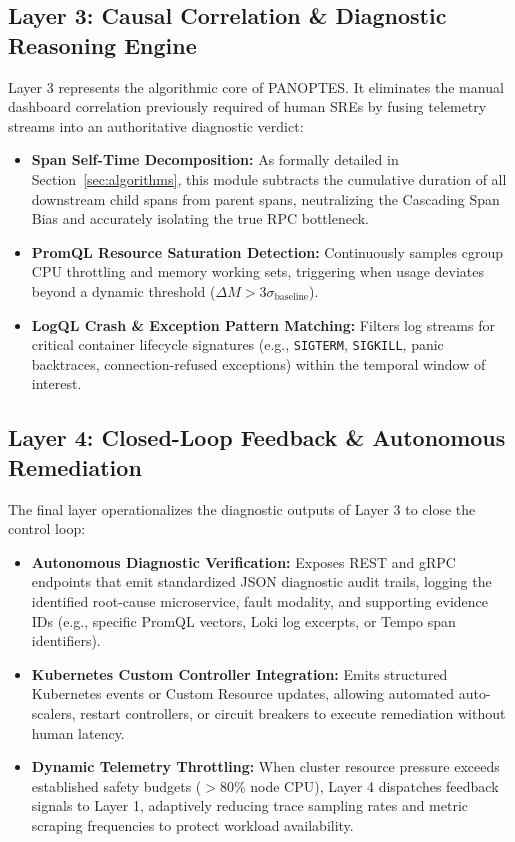 \subsection{Layer 3: Causal Correlation \& Diagnostic Reasoning Engine}
Layer 3 represents the algorithmic core of PANOPTES. It eliminates the manual dashboard correlation previously required of human SREs by fusing telemetry streams into an authoritative diagnostic verdict:
\begin{itemize}[leftmargin=1.2em, itemsep=2pt, topsep=3pt]
    \item \textbf{Span Self-Time Decomposition:} As formally detailed in Section~\ref{sec:algorithms}, this module subtracts the cumulative duration of all downstream child spans from parent spans, neutralizing the Cascading Span Bias and accurately isolating the true RPC bottleneck.
    \item \textbf{PromQL Resource Saturation Detection:} Continuously samples cgroup CPU throttling and memory working sets, triggering when usage deviates beyond a dynamic threshold ($\Delta M > 3\sigma_{\text{baseline}}$).
    \item \textbf{LogQL Crash \& Exception Pattern Matching:} Filters log streams for critical container lifecycle signatures (e.g., \texttt{SIGTERM}, \texttt{SIGKILL}, panic backtraces, connection-refused exceptions) within the temporal window of interest.
\end{itemize}

\subsection{Layer 4: Closed-Loop Feedback \& Autonomous Remediation}
The final layer operationalizes the diagnostic outputs of Layer 3 to close the control loop:
\begin{itemize}[leftmargin=1.2em, itemsep=2pt, topsep=3pt]
    \item \textbf{Autonomous Diagnostic Verification:} Exposes REST and gRPC endpoints that emit standardized JSON diagnostic audit trails, logging the identified root-cause microservice, fault modality, and supporting evidence IDs (e.g., specific PromQL vectors, Loki log excerpts, or Tempo span identifiers).
    \item \textbf{Kubernetes Custom Controller Integration:} Emits structured Kubernetes events or Custom Resource updates, allowing automated auto-scalers, restart controllers, or circuit breakers to execute remediation without human latency.
    \item \textbf{Dynamic Telemetry Throttling:} When cluster resource pressure exceeds established safety budgets ($>80\%$ node CPU), Layer 4 dispatches feedback signals to Layer 1, adaptively reducing trace sampling rates and metric scraping frequencies to protect workload availability.
\end{itemize}
